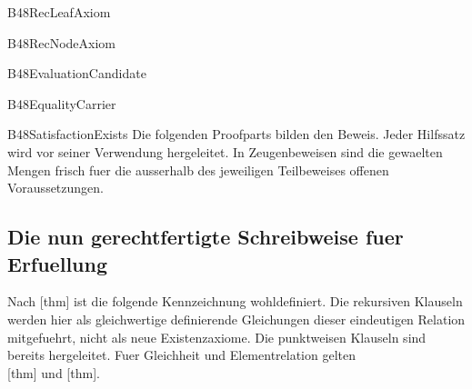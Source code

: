 {B48RecLeafAxiom}{}

{B48RecNodeAxiom}{}

{B48EvaluationCandidate}{}

{B48EqualityCarrier}{}

{B48SatisfactionExists}{
 }
\noindent
Die folgenden Proofparts bilden den Beweis. Jeder Hilfssatz wird vor
seiner Verwendung hergeleitet. In Zeugenbeweisen sind die gewaelten
Mengen frisch fuer die ausserhalb des jeweiligen Teilbeweises offenen
Voraussetzungen.



\subsection*{Die nun gerechtfertigte Schreibweise fuer Erfuellung}

Nach [thm] ist die folgende
Kennzeichnung wohldefiniert. Die rekursiven Klauseln werden hier als
gleichwertige definierende Gleichungen dieser eindeutigen Relation
mitgefuehrt, nicht als neue Existenzaxiome.
Die punktweisen Klauseln sind bereits hergeleitet.
Fuer Gleichheit und Elementrelation gelten\\
[thm] und [thm].

